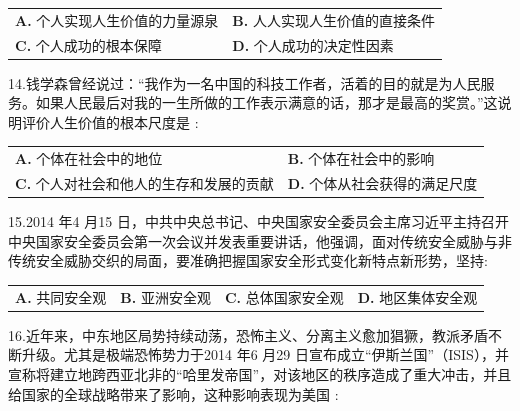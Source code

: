 \documentclass[UTF8,11pt]{ctexart}
\begin{document}
\begin{center}\begin{tabular}{>{\raggedright\arraybackslash}p{\dimexpr(\linewidth-4\tabcolsep)/2\relax}>{\raggedright\arraybackslash}p{\dimexpr(\linewidth-4\tabcolsep)/2\relax}}
\textbf{A.} 个人实现人生价值的力量源泉 & \textbf{B.} 人人实现人生价值的直接条件\\[.35em]
\textbf{C.} 个人成功的根本保障 & \textbf{D.} 个人成功的决定性因素\\[.35em]\end{tabular}\end{center}

14.钱学森曾经说过：“我作为一名中国的科技工作者，活着的目的就是为人民服务。如果人民最后对我的一生所做的工作表示满意的话，那才是最高的奖赏。”这说明评价人生价值的根本尺度是 :


\begin{center}\begin{tabular}{>{\raggedright\arraybackslash}p{\dimexpr(\linewidth-4\tabcolsep)/2\relax}>{\raggedright\arraybackslash}p{\dimexpr(\linewidth-4\tabcolsep)/2\relax}}
\textbf{A.} 个体在社会中的地位 & \textbf{B.} 个体在社会中的影响\\[.35em]
\textbf{C.} 个人对社会和他人的生存和发展的贡献 & \textbf{D.} 个体从社会获得的满足尺度\\[.35em]\end{tabular}\end{center}

15.2014 年4 月15 日，中共中央总书记、中央国家安全委员会主席习近平主持召开中央国家安全委员会第一次会议并发表重要讲话，他强调，面对传统安全威胁与非传统安全威胁交织的局面，要准确把握国家安全形式变化新特点新形势，坚持:


\begin{center}\begin{tabular}{>{\raggedright\arraybackslash}p{\dimexpr(\linewidth-8\tabcolsep)/4\relax}>{\raggedright\arraybackslash}p{\dimexpr(\linewidth-8\tabcolsep)/4\relax}>{\raggedright\arraybackslash}p{\dimexpr(\linewidth-8\tabcolsep)/4\relax}>{\raggedright\arraybackslash}p{\dimexpr(\linewidth-8\tabcolsep)/4\relax}}
\textbf{A.} 共同安全观 & \textbf{B.} 亚洲安全观 & \textbf{C.} 总体国家安全观 & \textbf{D.} 地区集体安全观\\[.35em]\end{tabular}\end{center}

16.近年来，中东地区局势持续动荡，恐怖主义、分离主义愈加猖獗，教派矛盾不断升级。尤其是极端恐怖势力于2014 年6 月29 日宣布成立“伊斯兰国”（ISIS），并宣称将建立地跨西亚北非的“哈里发帝国”，对该地区的秩序造成了重大冲击，并且给国家的全球战略带来了影响，这种影响表现为美国 :
\end{document}
